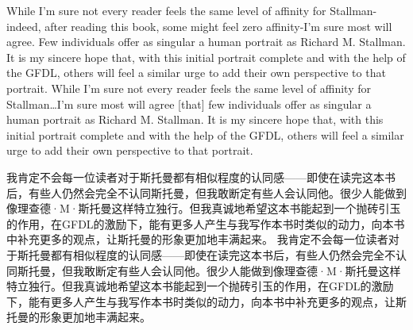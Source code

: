 \ifdefined\eng
\ifdefined\vone
While I'm sure not every reader feels the same level of affinity for Stallman-indeed, after reading this book, some might feel zero affinity-I'm sure most will agree. Few individuals offer as singular a human portrait as Richard M. Stallman. It is my sincere hope that, with this initial portrait complete and with the help of the GFDL, others will feel a similar urge to add their own perspective to that portrait.
\fi
\ifdefined\vtwo
While I'm sure not every reader feels the same level of affinity for Stallman\ldots I'm sure most will agree [that] few individuals offer as singular a human portrait as Richard M. Stallman. It is my sincere hope that, with this initial portrait complete and with the help of the GFDL, others will feel a similar urge to add their own perspective to that portrait.
\fi
\fi

\ifdefined\chs
\ifdefined\vone
我肯定不会每一位读者对于斯托曼都有相似程度的认同感——即使在读完这本书后，有些人仍然会完全不认同斯托曼，但我敢断定有些人会认同他。很少人能做到像理查德·M·斯托曼这样特立独行。但我真诚地希望这本书能起到一个抛砖引玉的作用，在GFDL的激励下，能有更多人产生与我写作本书时类似的动力，向本书中补充更多的观点，让斯托曼的形象更加地丰满起来。
\fi
\ifdefined\vtwo
我肯定不会每一位读者对于斯托曼都有相似程度的认同感——即使在读完这本书后，有些人仍然会完全不认同斯托曼，但我敢断定有些人会认同他。很少人能做到像理查德·M·斯托曼这样特立独行。但我真诚地希望这本书能起到一个抛砖引玉的作用，在GFDL的激励下，能有更多人产生与我写作本书时类似的动力，向本书中补充更多的观点，让斯托曼的形象更加地丰满起来。
\fi
\fi

\theendnotes
\setcounter{endnote}{0}
